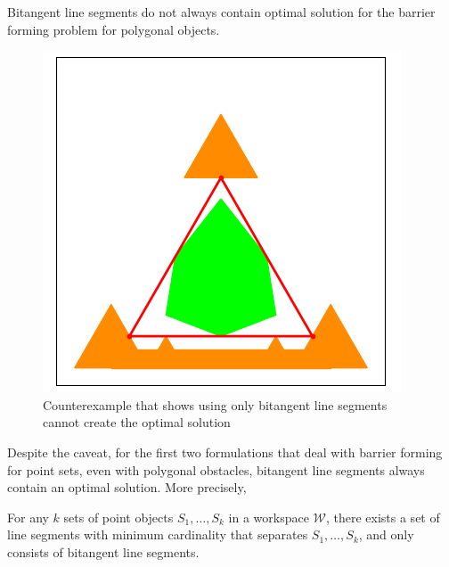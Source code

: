 \begin{proposition}
Bitangent line segments do not always contain optimal solution for the barrier forming problem for polygonal objects.
\end{proposition}

\begin{figure}[ht]
    \centering
    \vspace{-.2in}
    \includegraphics[width = .25\textwidth]{chapters/bc/fig/counter_example.png}
    \vspace{0.0in}
    \caption{Counterexample that shows using only bitangent line segments cannot create the optimal solution}
    \label{fig:counter}
\end{figure}

Despite the caveat, for the first two formulations that deal with barrier forming for point sets, even with polygonal obstacles, bitangent line segments
always contain an optimal solution. More precisely, 
\begin{theorem}
For any $k$ sets of point objects $S_1, \dots, S_k$ in a workspace $\mathcal W$, there exists
a set of line segments with minimum cardinality that separates $S_1, \dots, S_k$, 
and only consists of bitangent line segments.
\end{theorem}

